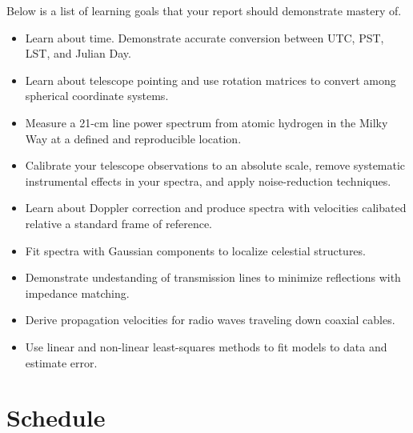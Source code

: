 \documentclass[11pt,preprint]{aastex}
\begin{document}
Below is a list of learning goals that your report should demonstrate mastery of.

\begin{itemize}

\item Learn about time. Demonstrate accurate conversion between UTC, PST, LST,
and Julian Day.

\item Learn about telescope pointing and use rotation matrices to convert among spherical
  coordinate systems.

\item Measure a 21-cm line power spectrum from atomic hydrogen in the
  Milky Way at a defined and reproducible location.

\item Calibrate your telescope observations to an absolute scale, remove
systematic instrumental effects in your spectra, and apply noise-reduction
techniques.

\item Learn about Doppler correction and produce spectra with velocities 
calibated relative a standard frame of reference.

\item Fit spectra with Gaussian components to localize celestial structures.

\item Demonstrate undestanding of transmission lines to 
minimize reflections with impedance matching.

\item Derive propagation velocities for radio waves traveling down coaxial cables.

\item Use linear and non-linear least-squares methods to fit models to data and
estimate error.

\end{itemize}

\section{Schedule}
\end{document}

